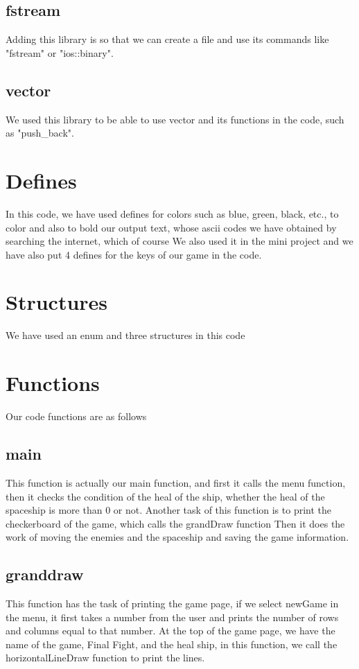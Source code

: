 \documentclass[12pt,a4paper]{article}
\begin{document}
	\subsection{fstream}
	Adding this library is so that we can create a file and use its commands like "fstream" or "ios::binary".
	\subsection{vector}
	We used this library to be able to use vector and its functions in the code, such as "push_back".

	\section{Defines}\label{description.defines}
	In this code, we have used defines for colors such as blue, green, black, etc., to color and also to bold our output text, whose ascii codes we have obtained by searching the internet, 
	which of course We also used it in the mini project and we have also put 4 defines for the keys of our game in the code.
	\section{Structures}\label{description.structs}
	We have used an enum and three structures in this code
	\section{Functions}\label{description.func}
	Our code functions are as follows
	\subsection{main}
	This function is actually our main function, and first it calls the menu function, then it checks the condition of the heal of the ship, whether the heal of the spaceship is more than 0 or not.
    Another task of this function is to print the checkerboard of the game, which calls the grandDraw function
    Then it does the work of moving the enemies and the spaceship and saving the game information.
	
	\subsection{granddraw}
	This function has the task of printing the game page, if we select newGame in the menu, it first takes a number from the user and prints the number of rows and columns equal to that number.
    At the top of the game page, we have the name of the game, Final Fight, and the heal ship, in this function, we call the horizontalLineDraw function to print the lines.
\end{document}
